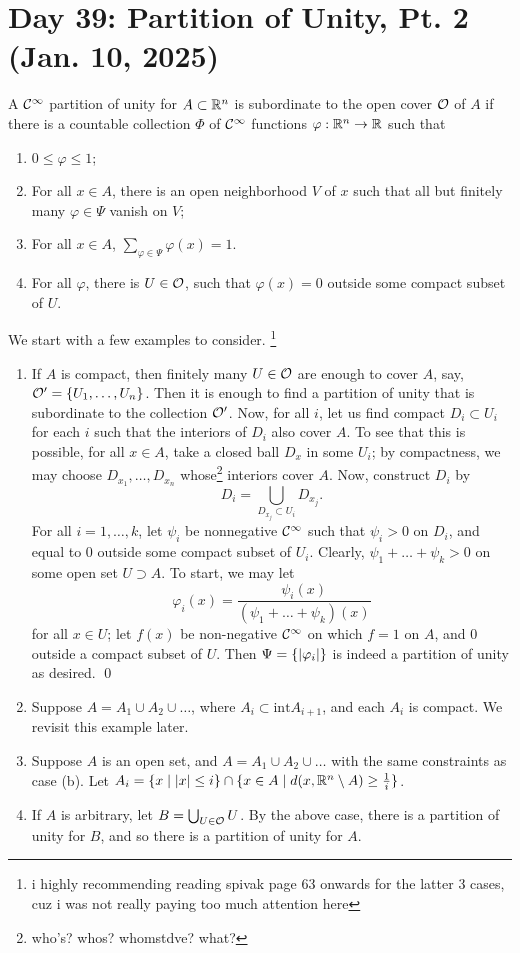\section{Day 39: Partition of Unity, Pt. 2 (Jan. 10, 2025)}
A $\mathcal C^\infty$ partition of unity for $A \subset \mathbb R^n$ is subordinate to the open cover $\mathcal O$ of $A$ if there is a countable collection $\Phi$ of $\mathcal C^\infty$ functions $\varphi : \mathbb R^n \to \mathbb R$ such that
\begin{enumerate}[label=(\roman*)]
    \item $0 \leq \varphi \leq 1$;
    \item For all $x \in A$, there is an open neighborhood $V$ of $x$ such that all but finitely many $\varphi \in \Psi$ vanish on $V$;
    \item For all $x \in A$, $\sum_{\varphi \in \Psi} \varphi(x) = 1$.
    \item For all $\varphi$, there is $U \in \mathcal O$, such that $\varphi(x) = 0$ outside some compact subset of $U$.
\end{enumerate}
We start with a few examples to consider. \footnote{i highly recommending reading spivak page 63 onwards for the latter 3 cases, cuz i was not really paying too much attention here}
\begin{enumerate}[label=(\alph*)]
    \item If $A$ is compact, then finitely many $U \in \mathcal O$ are enough to cover $A$, say, $\mathcal O' = \{U_1, \dots, U_n\}$. Then it is enough to find a partition of unity that is subordinate to the collection $\mathcal O'$. Now, for all $i$, let us find compact $D_i \subset U_i$ for each $i$ such that the interiors of $D_i$ also cover $A$. To see that this is possible, for all $x \in A$, take a closed ball $D_x$ in some $U_i$; by compactness, we may choose $D_{x_1}, \dots, D_{x_n}$ whose\footnote{who's? whos? whomstdve? what?} interiors cover $A$. Now, construct $D_i$ by
    \[ D_i = \bigcup_{D_{x_j} \subset U_i} D_{x_j}. \]
    For all $i = 1, \dots, k$, let $\psi_i$ be nonnegative $\mathcal C^\infty$ such that $\psi_i > 0$ on $D_i$, and equal to $0$ outside some compact subset of $U_i$. Clearly, $\psi_1 + \dots + \psi_k > 0$ on some open set $U \supset A$. To start, we may let
    \[ \varphi_i(x) = \frac{\psi_i(x)}{(\psi_1 + \dots + \psi_k)(x)} \]
    for all $x \in U$; let $f(x)$ be non-negative $\mathcal C^\infty$ on which $f = 1$ on $A$, and $0$ outside a compact subset of $U$. Then $\Psi = \{\left\lvert \varphi_i \right\rvert\}$ is indeed a partition of unity as desired. \qed
    \item Suppose $A = A_1 \cup A_2 \cup \dots$, where $A_i \subset \mathrm{int} A_{i+1}$, and each $A_i$ is compact. We revisit this example later.
    \item Suppose $A$ is an open set, and $A = A_1 \cup A_2 \cup \dots$ with the same constraints as case (b). Let $A_i = \{x \mid \left\lvert x \right\rvert \leq i\} \cap \{x \in A \mid d(x, \mathbb R^n \setminus A) \geq \frac{1}{i}\}$.
    \item If $A$ is arbitrary, let $B = \bigcup_{U \in \mathcal O} U$. By the above case, there is a partition of unity for $B$, and so there is a partition of unity for $A$.
\end{enumerate}
